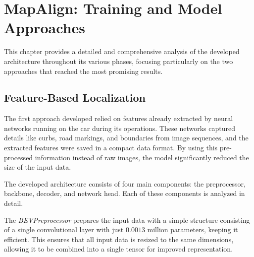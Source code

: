\chapter{MapAlign: Training and Model Approaches}

This chapter provides a detailed and comprehensive analysis of the developed architecture throughout its various phases, focusing particularly on the two approaches that reached the most promising results.

\section{Feature-Based Localization}

The first approach developed relied on features already extracted by neural networks running on the car during its operations. These networks captured details like curbs, road markings, and boundaries from image sequences, and the extracted features were saved in a compact data format. By using this pre-processed information instead of raw images, the model significantly reduced the size of the input data.

The developed architecture consists of four main components: the preprocessor, backbone, decoder, and network head. Each of these components is analyzed in detail.

The \textit{BEVPreprocessor} prepares the input data with a simple structure consisting of a single convolutional layer with just $0.0013$ million parameters, keeping it efficient. This ensures that all input data is resized to the same dimensions, allowing it to be combined into a single tensor for improved representation.

